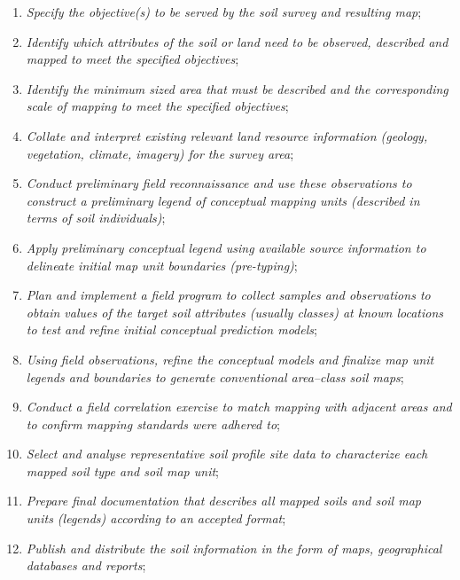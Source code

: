 \documentclass[11pt]{krantz}
\theoremstyle{definition}
\theoremstyle{definition}
\theoremstyle{definition}
\theoremstyle{remark}
\begin{document}
\begin{enumerate}
\def\labelenumi{\arabic{enumi}.}
\item
  \emph{Specify the objective(s) to be served by the soil survey and
  resulting map};
\item
  \emph{Identify which attributes of the soil or land need to be
  observed, described and mapped to meet the specified objectives};
\item
  \emph{Identify the minimum sized area that must be described and the
  corresponding scale of mapping to meet the specified objectives};
\item
  \emph{Collate and interpret existing relevant land resource
  information (geology, vegetation, climate, imagery) for the survey
  area};
\item
  \emph{Conduct preliminary field reconnaissance and use these
  observations to construct a preliminary legend of conceptual mapping
  units (described in terms of soil individuals)};
\item
  \emph{Apply preliminary conceptual legend using available source
  information to delineate initial map unit boundaries (pre-typing)};
\item
  \emph{Plan and implement a field program to collect samples and
  observations to obtain values of the target soil attributes (usually
  classes) at known locations to test and refine initial conceptual
  prediction models};
\item
  \emph{Using field observations, refine the conceptual models and
  finalize map unit legends and boundaries to generate conventional
  area--class soil maps};
\item
  \emph{Conduct a field correlation exercise to match mapping with
  adjacent areas and to confirm mapping standards were adhered to};
\item
  \emph{Select and analyse representative soil profile site data to
  characterize each mapped soil type and soil map unit};
\item
  \emph{Prepare final documentation that describes all mapped soils and
  soil map units (legends) according to an accepted format};
\item
  \emph{Publish and distribute the soil information in the form of maps,
  geographical databases and reports};
\end{enumerate}
\end{document}

